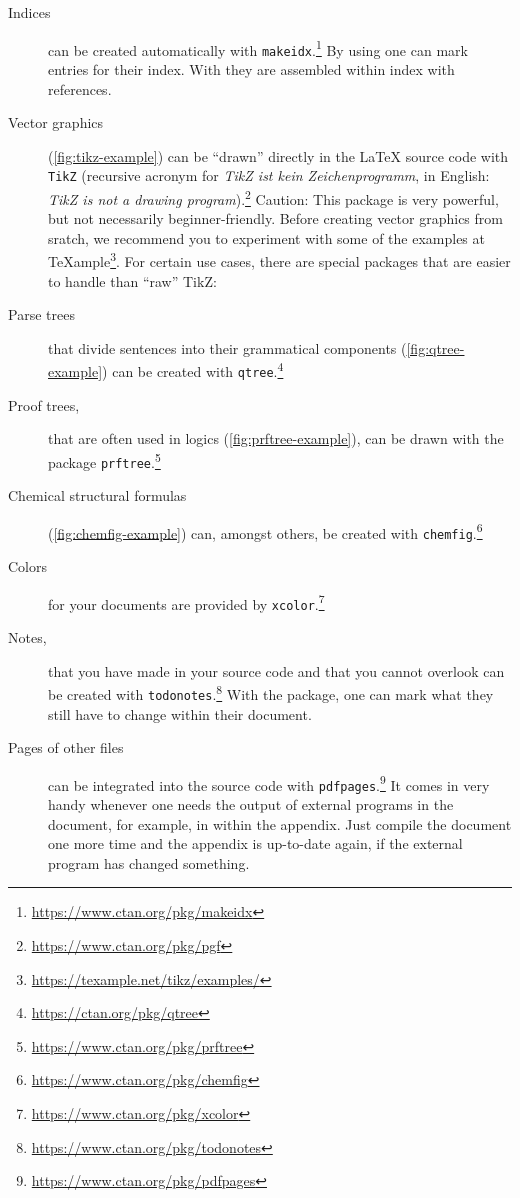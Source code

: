 \begin{description}
	\item[Indices]
		can be created automatically with \texttt{makeidx}.\footnote{\url{https://www.ctan.org/pkg/makeidx}}
		By using \texttt{} one can mark entries for their index. With \texttt{\printindex} they are assembled within index with references.
	\item[Vector graphics]
		(\cref{fig:tikz-example})
				can be \enquote{drawn} directly in the \LaTeX{} source code with \texttt{TikZ} (recursive acronym for \emph{TikZ ist kein Zeichenprogramm}, in English: \emph{TikZ is not a drawing program}).\footnote{\url{https://www.ctan.org/pkg/pgf}}
		Caution: This package is very powerful, but not necessarily beginner-friendly.
		Before creating vector graphics from sratch, we recommend you to experiment with some of the examples at \TeX{}ample\footnote{\url{https://texample.net/tikz/examples/}}. 
		For certain use cases, there are special packages that are easier to handle than \enquote{raw} TikZ:
	\item[Parse trees]
		that divide sentences into their grammatical components (\cref{fig:qtree-example}) can be created with \texttt{qtree}.\footnote{\url{https://ctan.org/pkg/qtree}}
	\item[Proof trees,]
		that are often used in logics (\cref{fig:prftree-example}), can be drawn with the package \texttt{prftree}.\footnote{\url{https://www.ctan.org/pkg/prftree}}
	\item[Chemical structural formulas]
		(\cref{fig:chemfig-example})
		can, amongst others, be created with  \texttt{chemfig}.\footnote{\url{https://www.ctan.org/pkg/chemfig}}
	\item[Colors]
		for your documents are provided by \texttt{xcolor}.\footnote{\url{https://www.ctan.org/pkg/xcolor}}
	\item[Notes,]
		that you have made in your source code and that you cannot overlook can be created with \texttt{todonotes}.\footnote{\url{https://www.ctan.org/pkg/todonotes}}
		With the package, one can mark what they still  have to change within their document.
	\item[Pages of other  files]
		can be integrated into the source code with \texttt{pdfpages}.\footnote{\url{https://www.ctan.org/pkg/pdfpages}}
		It comes in very handy whenever one needs the output of external programs in the document, for example, in within the appendix.
		Just compile the document one more time and the appendix is up-to-date again, if the external program has changed something.

\end{description}
